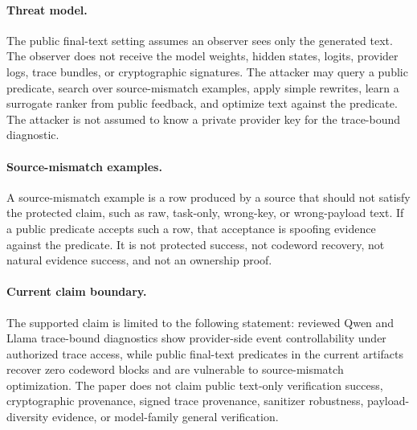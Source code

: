 \paragraph{Threat model.}
The public final-text setting assumes an observer sees only the generated text.
The observer does not receive the model weights, hidden states, logits,
provider logs, trace bundles, or cryptographic signatures.  The attacker may
query a public predicate, search over source-mismatch examples, apply simple
rewrites, learn a surrogate ranker from public feedback, and optimize text
against the predicate.  The attacker is not assumed to know a private provider
key for the trace-bound diagnostic.

\paragraph{Source-mismatch examples.}
A source-mismatch example is a row produced by a source that should not satisfy
the protected claim, such as raw, task-only, wrong-key, or wrong-payload text.
If a public predicate accepts such a row, that acceptance is spoofing evidence
against the predicate.  It is not protected success, not codeword recovery, not
natural evidence success, and not an ownership proof.

\paragraph{Current claim boundary.}
The supported claim is limited to the following statement: reviewed Qwen and
Llama trace-bound diagnostics show provider-side event controllability under
authorized trace access, while public final-text predicates in the current
artifacts recover zero codeword blocks and are vulnerable to source-mismatch
optimization.  The paper does not claim public text-only verification success,
cryptographic provenance, signed trace provenance, sanitizer robustness,
payload-diversity evidence, or model-family general verification.
